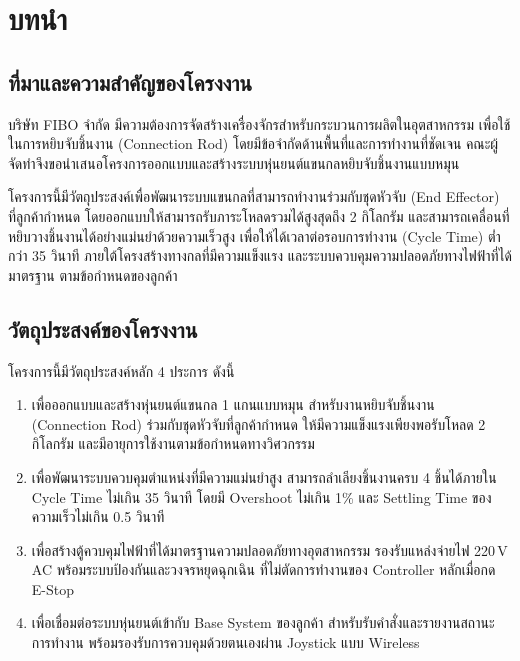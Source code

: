 
\chapter{บทนำ}
\label{ch:introduction}

\section{ที่มาและความสำคัญของโครงงาน}
\label{sec:background}

บริษัท FIBO จำกัด มีความต้องการจัดสร้างเครื่องจักรสำหรับกระบวนการผลิตในอุตสาหกรรม
เพื่อใช้ในการหยิบจับชิ้นงาน (Connection Rod) โดยมีข้อจำกัดด้านพื้นที่และการทำงานที่ชัดเจน
คณะผู้จัดทำจึงขอนำเสนอโครงการออกแบบและสร้างระบบหุ่นยนต์แขนกลหยิบจับชิ้นงานแบบหมุน

โครงการนี้มีวัตถุประสงค์เพื่อพัฒนาระบบแขนกลที่สามารถทำงานร่วมกับชุดหัวจับ
(End Effector) ที่ลูกค้ากำหนด โดยออกแบบให้สามารถรับภาระโหลดรวมได้สูงสุดถึง 2 กิโลกรัม
และสามารถเคลื่อนที่หยิบวางชิ้นงานได้อย่างแม่นยำด้วยความเร็วสูง
เพื่อให้ได้เวลาต่อรอบการทำงาน (Cycle Time) ต่ำกว่า 35 วินาที
ภายใต้โครงสร้างทางกลที่มีความแข็งแรง และระบบควบคุมความปลอดภัยทางไฟฟ้าที่ได้มาตรฐาน
ตามข้อกำหนดของลูกค้า

\section{วัตถุประสงค์ของโครงงาน}
\label{sec:objectives}

โครงการนี้มีวัตถุประสงค์หลัก 4 ประการ ดังนี้

\begin{enumerate}
  \item เพื่อออกแบบและสร้างหุ่นยนต์แขนกล 1 แกนแบบหมุน
        สำหรับงานหยิบจับชิ้นงาน (Connection Rod) ร่วมกับชุดหัวจับที่ลูกค้ากำหนด
        ให้มีความแข็งแรงเพียงพอรับโหลด 2 กิโลกรัม
        และมีอายุการใช้งานตามข้อกำหนดทางวิศวกรรม

  \item เพื่อพัฒนาระบบควบคุมตำแหน่งที่มีความแม่นยำสูง
        สามารถลำเลียงชิ้นงานครบ 4 ชิ้นได้ภายใน Cycle Time ไม่เกิน 35 วินาที
        โดยมี Overshoot ไม่เกิน 1\% และ Settling Time ของความเร็วไม่เกิน 0.5 วินาที

  \item เพื่อสร้างตู้ควบคุมไฟฟ้าที่ได้มาตรฐานความปลอดภัยทางอุตสาหกรรม
        รองรับแหล่งจ่ายไฟ 220\,V AC พร้อมระบบป้องกันและวงจรหยุดฉุกเฉิน
        ที่ไม่ตัดการทำงานของ Controller หลักเมื่อกด E-Stop

  \item เพื่อเชื่อมต่อระบบหุ่นยนต์เข้ากับ Base System ของลูกค้า
        สำหรับรับคำสั่งและรายงานสถานะการทำงาน
        พร้อมรองรับการควบคุมด้วยตนเองผ่าน Joystick แบบ Wireless
\end{enumerate}

